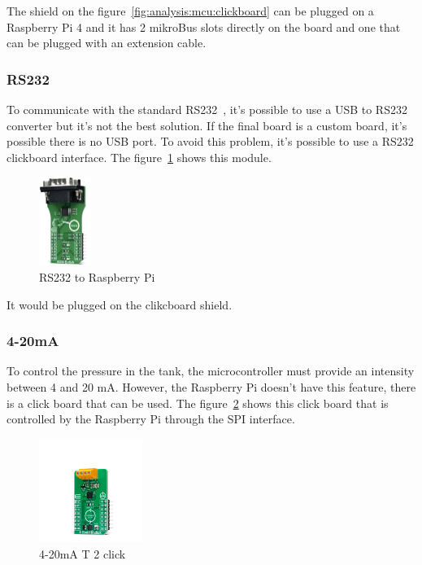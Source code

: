The shield on the figure~\ref{fig:analysis:mcu:clickboard} can be plugged on a Raspberry Pi 4 and it has 2 mikroBus slots directly on the board and one that can be plugged with an extension cable.


\subsubsection{RS232}
\label{subsubsec:rs232}
To communicate with the standard RS232~\cite{rs-232}, it's possible to use a USB to RS232 converter but it's not the best solution.
If the final board is a custom board, it's possible there is no USB port.
To avoid this problem, it's possible to use a RS232 clickboard interface.
The figure~\ref{fig:analysis:mcu:rs232} shows this module.

\begin{figure}[ht]
  \centering
  \includegraphics[width=0.15\textwidth]{img/rs232-converter}
  \caption{RS232 to Raspberry Pi~\cite{mikroe-rs232}}
  \label{fig:analysis:mcu:rs232}
\end{figure}

It would be plugged on the clikcboard shield.

\subsubsection{4-20mA}
\label{subsubsec:4-20ma}
To control the pressure in the tank, the microcontroller must provide an intensity between 4 and 20 mA\@.
However, the Raspberry Pi doesn't have this feature, there is a click board that can be used.
The figure~\ref{fig:analysis:mcu:4-20mA} shows this click board that is controlled by the Raspberry Pi through the SPI interface.

\begin{figure}[ht]
  \centering
  \includegraphics[width=0.3\textwidth]{img/4-20ma}
  \caption{4-20mA T 2 click~\cite{mikroe-420ma}}
  \label{fig:analysis:mcu:4-20mA}
\end{figure}

